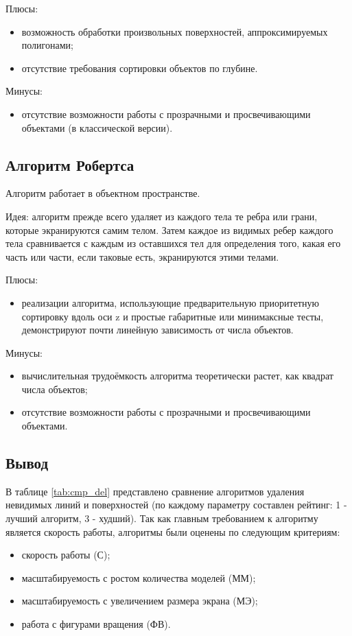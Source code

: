 Плюсы:
\begin{itemize}
    \item возможность обработки произвольных поверхностей, аппроксимируемых полигонами;
    \item отсутствие требования сортировки объектов по глубине.
\end{itemize}

Минусы:
\begin{itemize}
    \item отсутствие возможности работы с прозрачными и просвечивающими объектами (в классической версии).
\end{itemize}

\subsection{Алгоритм Робертса}
Алгоритм работает в объектном пространстве\cite{robert}. 

Идея: алгоритм прежде всего удаляет из каждого тела те ребра или грани, которые экранируются самим телом. Затем каждое из видимых ребер каждого тела сравнивается с каждым из оставшихся тел для определения того, какая его часть или части, если таковые есть, экранируются этими телами.

Плюсы:
\begin{itemize}
    \item реализации алгоритма, использующие предварительную приоритетную сортировку вдоль оси z и простые габаритные или минимаксные тесты, демонстрируют почти линейную зависимость от числа объектов\cite{robert}.
\end{itemize}

Минусы:
\begin{itemize}
    \item вычислительная трудоёмкость алгоритма теоретически растет, как квадрат числа объектов\cite{robert};
    \item отсутствие возможности работы с прозрачными и просвечивающими объектами.
\end{itemize}

\subsection*{Вывод}

В таблице \ref{tab:cmp_del} представлено сравнение алгоритмов\cite{rogers} удаления невидимых линий и поверхностей (по каждому параметру составлен рейтинг: 1 - лучший алгоритм, 3 - худший). Так как главным требованием к алгоритму является скорость работы, алгоритмы были оценены по следующим критериям:
\begin{itemize}
    \item скорость работы (С);
    \item масштабируемость с ростом количества моделей (ММ);
    \item масштабируемость с увеличением размера экрана (МЭ);
    \item работа с фигурами вращения (ФВ).
\end{itemize}

